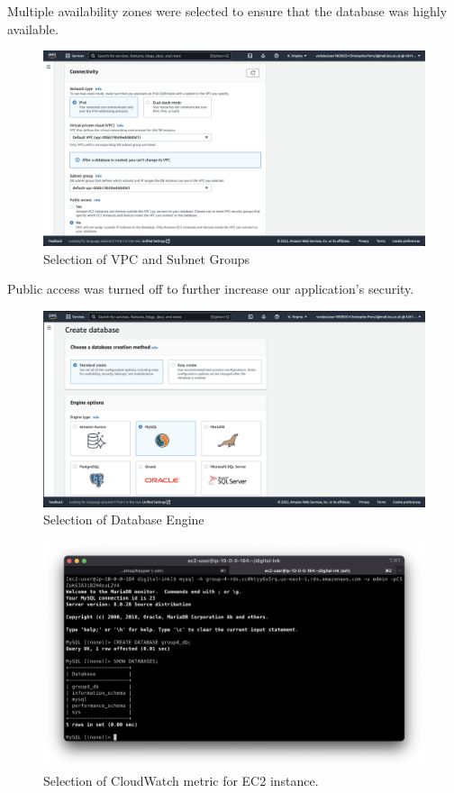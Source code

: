 Multiple availability zones were selected to ensure that the database was highly available.

\begin{figure}[!htbp]
    \centering
    \includegraphics[width=\textwidth]{resources/rds/rds-connectivity-1.png}
    \caption{Selection of VPC and Subnet Groups}
    \label{fig:rds-connecting}
\end{figure}

Public access was turned off to further increase our application's security.

\begin{figure}[!htbp]
    \centering
    \includegraphics[width=\textwidth]{resources/rds/rds-create-engine.png}
    \caption{Selection of Database Engine}
    \label{fig:rds-engine}
\end{figure}

\begin{figure}[!htbp]
    \centering
    \includegraphics[width=\textwidth]{resources/rds/rds-database-creation.png}
    \caption{Selection of CloudWatch metric for EC2 instance.}
    \label{fig:rds-db-create}
\end{figure}

